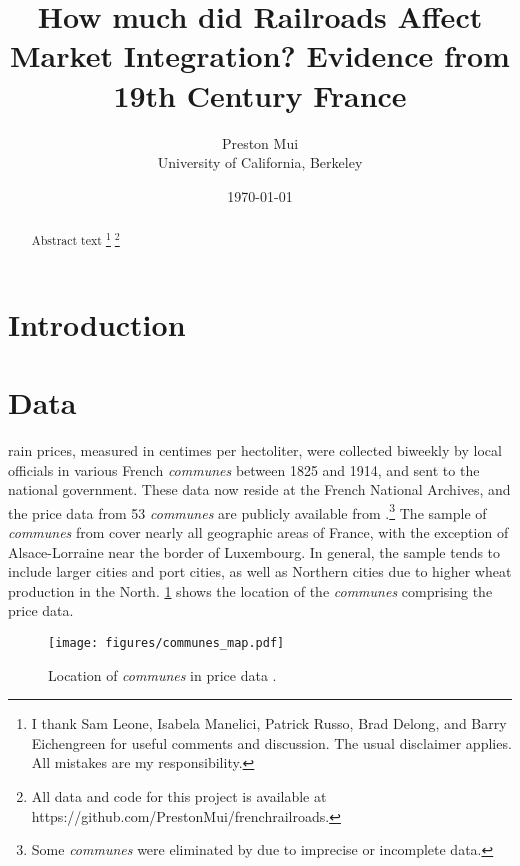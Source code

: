 \documentclass[12pt,twoside]{article}
\title{How much did Railroads Affect Market Integration? Evidence from 19th Century France}
\date{\today}
\author{Preston Mui \\ University of California, Berkeley}
\begin{document}
\maketitle

\begin{abstract}
   Abstract text
   \footnote{I thank Sam Leone, Isabela Manelici, Patrick Russo, Brad Delong, and Barry Eichengreen for useful comments and discussion. The usual disclaimer applies. All mistakes are my responsibility.}
   \footnote{All data and code for this project is available at https://github.com/PrestonMui/frenchrailroads.}
\end{abstract}

\newpage
\section{Introduction}

\section{Data}

rain prices, measured in centimes per hectoliter, were collected biweekly by local officials in various French \emph{communes} between 1825 and 1914, and sent to the national government.
These data now reside at the French National Archives, and the price data from 53 \emph{communes} are publicly available from \cite{prices}.\footnote{Some \emph{communes} were eliminated by \cite{prices} due to imprecise or incomplete data.}
The sample of \emph{communes} from \cite{prices} cover nearly all geographic areas of France, with the exception of Alsace-Lorraine near the border of Luxembourg.
In general, the sample tends to include larger cities and port cities, as well as Northern cities due to higher wheat production in the North.
\ref{fig:communes_map} shows the location of the \emph{communes} comprising the price data.

\begin{figure}[h]
	\centering
	\texttt{[image: figures/communes\_map.pdf]}
	\caption{Location of \emph{communes} in price data \citep{prices}.}
	\label{fig:communes_map}
\end{figure}

\end{document}
